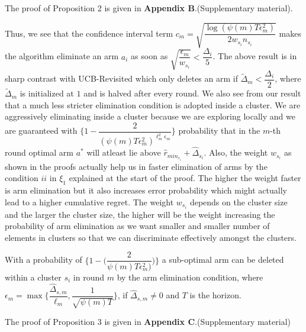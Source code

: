 	The proof of Proposition 2 is given in \textbf{Appendix B}.(Supplementary material).

\begin{remark}
	
	Thus, we see that the confidence interval term $c_{m}=\sqrt{\dfrac{\log (\psi(m)T\epsilon_{m}^{2})}{2w_{s_{i}} n_{s_{i}}}}$ makes the algorithm eliminate an arm $a_{i}$ as soon as $\sqrt{\dfrac{\epsilon_{m}}{w_{s_{i}}}}<\dfrac{\Delta_{i}}{5}$. The above result is in sharp contrast with UCB-Revisited which only deletes an arm if $\tilde{\Delta}_{m}<\dfrac{\Delta_{i}}{2}$, where $\tilde{\Delta}_{m}$ is initialized at $1$ and is halved after every round. We also see from our result that a much less stricter elimination condition is adopted inside a cluster. We are aggressively eliminating inside a cluster because we are exploring locally and we are guaranteed with  $\bigg\lbrace 1- \dfrac{2}{(\psi(m)T\epsilon_{m}^{2})^{\ell_{m}^{2}\epsilon_{m}}} \bigg\rbrace$ probability that in the $m$-th round optimal arm $a^{*}$ will atleast lie above $\hat{r}_{min_{s_{i}}}+ \hat{\Delta}_{s_{i}}$. Also, the weight $w_{s_{i}}$ as shown in the proofs actually help us in faster elimination of arms by the condition $ii$ in $\xi_
{1}$ explained at the start of the proof. The higher the weight faster is arm elimination but it also increases error probability which might actually lead to a higher cumulative regret. The weight $w_{s_{i}}$ depends on the cluster size and the larger the cluster size, the higher will be the weight increasing the probability of arm elimination as we want smaller and smaller number of elements in clusters so that we can discriminate effectively amongst the clusters.
\end{remark}


\begin{proposition}
With a probability of $\bigg\lbrace 1-\bigg(\dfrac{2}{\psi(m)T\epsilon_{m}^{2})}\bigg)\bigg\rbrace$ a sub-optimal arm can be deleted within a cluster $s_{i}$ in round $m$ by the arm elimination condition, where $\epsilon_{m}=\max{\bigg\lbrace\dfrac{\hat{\Delta}_{s,m}}{\ell_{m}}, \dfrac{1}{\sqrt{\psi{(m)T}}}\bigg\rbrace}$, if $\hat{\Delta}_{s,m}\neq 0$ and $T$ is the horizon.
\end{proposition}

	The proof of Proposition 3 is given in \textbf{Appendix C}.(Supplementary material)	

